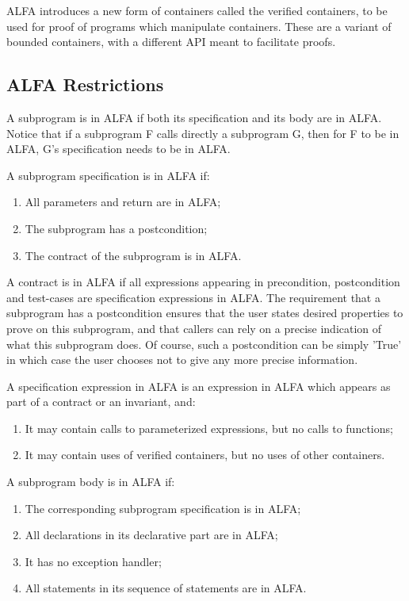 \documentclass{article}
\begin{document}
ALFA introduces a new form of containers called the verified containers, to be
used for proof of programs which manipulate containers. These are a variant of
bounded containers, with a different API meant to facilitate proofs.

\subsection{ALFA Restrictions}

A subprogram is in ALFA if both its specification and its body are in
ALFA. Notice that if a subprogram F calls directly a subprogram G, then for F
to be in ALFA, G's specification needs to be in ALFA.

A subprogram specification is in ALFA if:
\begin{enumerate}
\item All parameters and return are in ALFA;
\item The subprogram has a postcondition;
\item The contract of the subprogram is in ALFA.
\end{enumerate}

A contract is in ALFA if all expressions appearing in precondition,
postcondition and test-cases are specification expressions in ALFA. The
requirement that a subprogram has a postcondition ensures that the user states
desired properties to prove on this subprogram, and that callers can rely on a
precise indication of what this subprogram does. Of course, such a
postcondition can be simply 'True' in which case the user chooses not to give
any more precise information.

A specification expression in ALFA is an expression in ALFA which appears as
part of a contract or an invariant, and:
\begin{enumerate}
\item It may contain calls to parameterized expressions, but no calls to
  functions;
\item It may contain uses of verified containers, but no uses of other
  containers.
\end{enumerate}

A subprogram body is in ALFA if:
\begin{enumerate}
\item The corresponding subprogram specification is in ALFA;
\item All declarations in its declarative part are in ALFA;
\item It has no exception handler;
\item All statements in its sequence of statements are in ALFA.
\end{enumerate}
\end{document}
